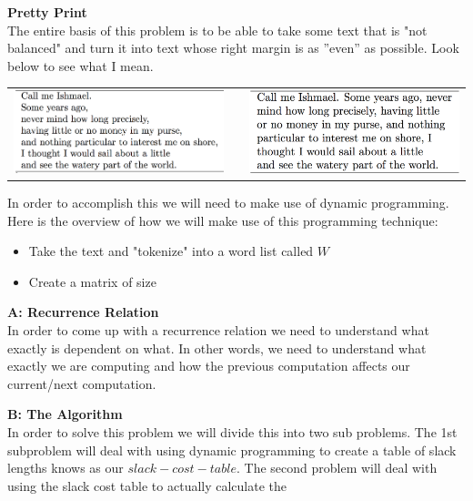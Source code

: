 \documentclass[11pt]{article}
\begin{document}
\newpage
\begin{solution} \textbf{Pretty Print}\\

	The entire basis of this problem is to be able to take some text that is "not balanced" and turn it into text whose right margin is as ”even” as possible. Look below to see what I mean.
		
		\hfil
		
		\begin{center}
			\begin{tabular}{ c c c}
 				\includegraphics[width=7cm]{images/unbalanced} & \rightarrow &  \includegraphics[width=7cm]{images/balanced}
			\end{tabular}
		\end{center}
		
	\hfil
	
	In order to accomplish this we will need to make use of dynamic programming. Here is the overview of how we will make use of this programming technique:
	
	\hfil
	
	\begin{itemize}
  		\item Take the text and "tokenize" into a word list called $W$
  		\item Create a matrix of size 
	\end{itemize}
	
	
	\hfil


	\textbf{A: Recurrence Relation} \\
	
	In order to come up with a recurrence relation we need to understand what exactly is dependent on what. In other words, we need to understand what exactly we are computing and how the previous computation affects our current/next computation.
	
	
	\hfil
	
	\textbf{B: The Algorithm} \\
	In order to solve this problem we will divide this into two sub problems. The 1st subproblem will deal with using dynamic programming to create a table of slack lengths knows as our $slack-cost-table$. The second problem will deal with using the slack cost table to actually calculate the 
	
		
	
\end{solution}



\begin{solution}
	
\end{solution}
\end{document}
